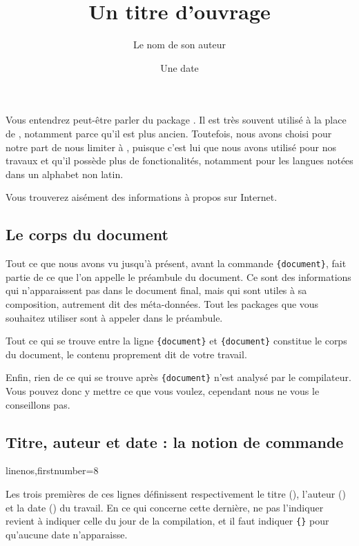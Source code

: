 \begin{plusloins}
Vous entendrez peut-être parler du package . Il est très souvent utilisé à la place de , notamment parce qu'il est plus ancien. Toutefois, nous avons choisi pour notre part de nous limiter à , puisque c'est lui que nous avons utilisé pour nos travaux et qu'il possède plus de fonctionalités, notamment pour les langues notées dans un alphabet non latin.

Vous trouverez aisément des informations à propos  sur Internet.

\end{plusloins}

\subsection{Le corps du document}

Tout ce que nous avons vu jusqu'à présent, avant la commande \verb|{document}|, fait partie de ce que l'on appelle le préambule du document.\label{preambule} Ce sont des informations qui n'apparaissent pas dans le document final, mais qui sont utiles à sa composition, autrement dit des méta-données. Tout les packages que vous souhaitez utiliser sont à appeler dans le préambule.

Tout ce qui se trouve entre la ligne \verb|{document}| et \verb|{document}| constitue le corps du document, le contenu proprement dit de votre travail.

Enfin, rien de ce qui se trouve après \verb|{document}| n'est analysé par le compilateur. Vous pouvez donc y mettre ce que vous voulez, cependant nous ne vous le conseillons pas.

\subsection{Titre, auteur et date : la notion de commande}\label{notioncommande}

\begin{latexcode*}{linenos,firstnumber=8}
\title{Un titre d'ouvrage}
\author{Le nom de son auteur}
\date{Une date}
\maketitle
\end{latexcode*}

Les trois premières de ces lignes définissent respectivement le titre (), l'auteur () et la date () du travail. En ce qui concerne cette dernière, ne pas l'indiquer revient à indiquer  celle du jour de la compilation, et il faut indiquer \verb|{}| pour qu'aucune date n'apparaisse.


